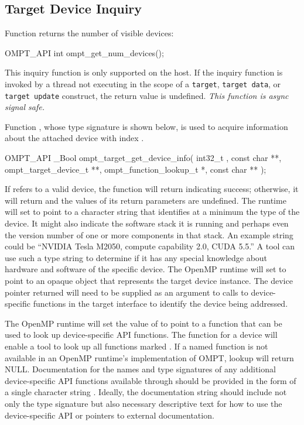 \documentclass{article}
\begin{document}
\subsection{Target Device Inquiry}
\label{sec:target-device}
Function  returns the number of visible devices:
\begin{boxedcode}
OMPT\_API int ompt\_get\_num\_devices();
\end{boxedcode}
This inquiry function is only supported on the host. If the inquiry function is invoked by a thread not executing in the scope of a {\tt target}, {\tt target data}, or {\tt target update} construct, the return value is undefined. {\it This function is async signal safe.}

Function , whose type signature is shown below, is used to acquire information about the attached device with  index . 
\begin{boxedcode}
OMPT\_API \_Bool ompt\_target\_get\_device\_info(
  int32\_t , 
  const char **, 
  ompt\_target\_device\_t **,
  ompt\_function\_lookup\_t *,
  const char **
);
\end{boxedcode}
If  refers to a valid device, the function will return  indicating success; otherwise, it will return  and the values of its return parameters are undefined. The runtime will set  to point to a character string that identifies at a minimum the  type of the device. It might also indicate the software stack it is running and perhaps even the version number of one or more components in that stack. An example string could be ``NVIDIA Tesla M2050, compute capability 2.0, CUDA 5.5.'' A tool can use such a type string to determine if it has any special knowledge about hardware and software of the specific device. The OpenMP runtime will set  to point to an opaque object that represents the target device instance. The device pointer returned will need to be supplied as an argument to calls to device-specific functions in the target interface to identify the device being addressed.

The OpenMP runtime will set the value of  to point to a function that can be used to look up device-specific API functions.  The  function for a device will enable a tool to look up all functions marked .  If a named function is not available in an OpenMP runtime's implementation of OMPT, lookup will return NULL. Documentation for the names and type signatures of any additional device-specific API functions available through  should be provided in the form of a single character string . Ideally, the documentation string should include not only the type signature but also necessary descriptive text for how to use the device-specific API or pointers to external documentation.
\end{document}
